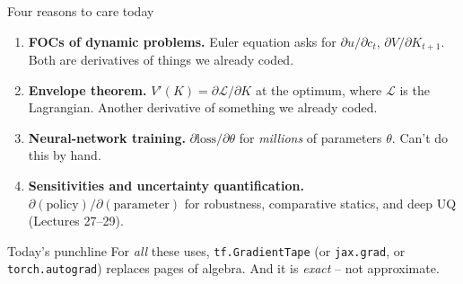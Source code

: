 \documentclass[aspectratio=169,11pt]{beamer}
\begin{document}
\begin{frame}{Four reasons to care today}
\small
\begin{enumerate}\itemsep5pt
\item \textbf{FOCs of dynamic problems.} Euler equation asks for $\partial u/\partial c_t$, $\partial V/\partial K_{t+1}$. Both are derivatives of things we already coded.
\item \textbf{Envelope theorem.} $V'(K) = \partial \mathcal{L}/\partial K$ at the optimum, where $\mathcal{L}$ is the Lagrangian. Another derivative of something we already coded.
\item \textbf{Neural-network training.} $\partial \mathrm{loss}/\partial \theta$ for \emph{millions} of parameters $\theta$. Can't do this by hand.
\item \textbf{Sensitivities and uncertainty quantification.} $\partial (\text{policy})/\partial (\text{parameter})$ for robustness, comparative statics, and deep UQ (Lectures 27--29).
\end{enumerate}
\vspace{4pt}
\begin{exampleblock}{Today's punchline}
\small For \emph{all} these uses, \texttt{tf.GradientTape} (or \texttt{jax.grad}, or \texttt{torch.autograd}) replaces pages of algebra. And it is \emph{exact} -- not approximate.
\end{exampleblock}
\end{frame}
\end{document}
